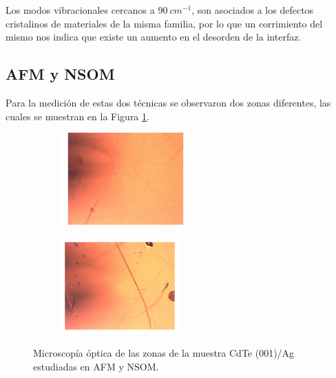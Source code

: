 Los modos vibracionales cercanos a $90\ cm^{-1}$, son asociados a los defectos cristalinos de materiales de la misma familia\cite{Qiu2021}, por lo que un corrimiento del mismo nos indica que existe un aumento en el desorden de la interfaz.

\subsection{AFM y NSOM}
\label{sec:ch4-cdte-afm-nsom}
Para la medición de estas dos técnicas se observaron dos zonas diferentes, las cuales se muestran en la 
Figura \ref{fig:afm-zones}.

\begin{figure}[H]
    \centering
    \begin{subfigure}[b]{0.48\textwidth}
        \centering
        \includegraphics[width = 0.55\textwidth]{figures/chap4/cdte-ag/afm-nsom-results/CdTe_Ag_Zona1_10X.pdf}
    \end{subfigure}\hfill
    \begin{subfigure}[b]{0.48\textwidth}
        \centering
        \includegraphics[width = 0.5\textwidth]{figures/chap4/cdte-ag/afm-nsom-results/CdTe_Ag_Zona2_10X.pdf}
    \end{subfigure}
\caption{Microscopía óptica de las zonas de la muestra CdTe (001)/Ag estudiadas en AFM y NSOM.}
\label{fig:afm-zones}
\end{figure}

